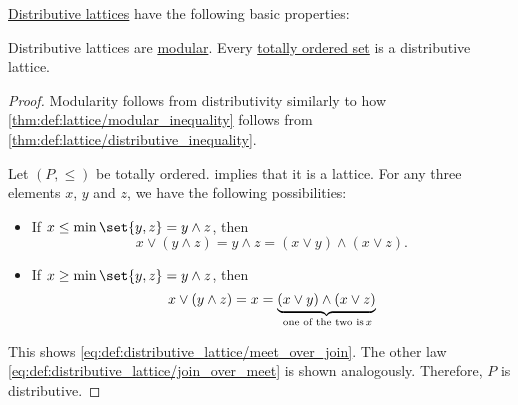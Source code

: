 \begin{proposition}\label{thm:def:distributive_lattice}
  \hyperref[def:distributive_lattice]{Distributive lattices} have the following basic properties:
  \begin{thmenum}
     Distributive lattices are \hyperref[def:modular_lattice]{modular}.
     Every \hyperref[def:totally_ordered_set]{totally ordered set} is a distributive lattice.
  \end{thmenum}
\end{proposition}
\begin{proof}
   Modularity follows from distributivity similarly to how \cref{thm:def:lattice/modular_inequality} follows from \cref{thm:def:lattice/distributive_inequality}.

   Let \( (P, \leq) \) be totally ordered.  implies that it is a lattice. For any three elements \( x \), \( y \) and \( z \), we have the following possibilities:
  \begin{itemize}
    \item If \( x \leq \min\set{ y, z } = y \wedge z \), then
    \begin{equation*}
      x \vee (y \wedge z) = y \wedge z = (x \vee y) \wedge (x \vee z).
    \end{equation*}

    \item If \( x \geq \min\set{ y, z } = y \wedge z \), then
    \begin{equation*}
      x \vee (y \wedge z) = x = \underbrace{(x \vee y) \wedge (x \vee z)}_{\T*{one of the two is} x}
    \end{equation*}
  \end{itemize}

  This shows \eqref{eq:def:distributive_lattice/meet_over_join}. The other law \eqref{eq:def:distributive_lattice/join_over_meet} is shown analogously. Therefore, \( P \) is distributive.
\end{proof}

